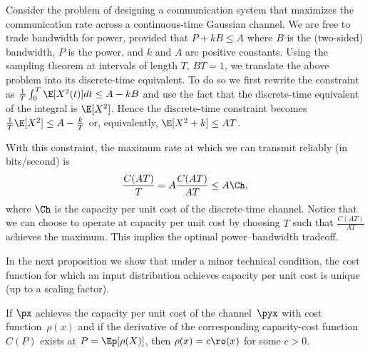 \begin{example}
Consider the problem of designing a communication system that maximizes the 
communication rate across a continuous-time Gaussian channel. We are free to trade 
bandwidth for power, provided that  $P+k B \leq A$ where $B$ is the (two-sided) bandwidth,
$P$ is the power, and $k$ and $A$ are positive constants. Using the sampling theorem 
at intervals of length $T$, $BT=1$, we
translate the above problem into its discrete-time equivalent. To do so we first rewrite the constraint as
$\frac{1}{T} \int_0^T \E[X^2(t)] dt \leq A- k B$ and use the fact that the discrete-time equivalent of 
the integral is $\E [X^2]$. Hence the discrete-time constraint becomes  $\frac{1}{T}\E [X^2] \leq A- \frac{k}{T}$ or, equivalently,
$\E [X^2 + k] \leq AT$. 


With this constraint, the maximum rate at which we can transmit reliably (in
bits/second) is \[ \frac{C(AT)}{T} = A \frac{C(AT)}{AT} \le A \Ch, \] where
$\Ch$ is the capacity per unit cost of the discrete-time channel. Notice that we
can choose to operate at capacity per unit cost by choosing $T$ such
that   $\frac{C(AT)}{AT}$ achieves the maximum. This implies the optimal
power--bandwidth tradeoff.
\end{example}


In the next proposition we show that under a minor technical condition, the cost
function for which an input distribution achieves capacity per unit cost is
unique (up to a scaling factor).

\begin{proposition}
  \label{prop:cucconverse}
  If $\px$ achieves the capacity per unit cost of the channel~$\pyx$ with cost
  function~$\rho(x)$ and if the derivative of the corresponding capacity-cost
  function $C(P)$ exists at $P = \Ep[\rho(X)]$, then $\rho(x) = c \ro(x)$ for
  some $c>0$.
\end{proposition}

